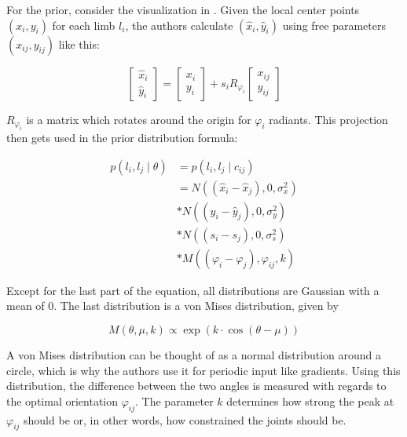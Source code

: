For the prior, consider the visualization in .
Given the local center points $(x_i, y_i)$ for each limb $l_i$, the authors calculate $(\hat{x}_i, \hat{y}_i)$ using free parameters $(x_{ij}, y_{ij})$ like this:

\begin{equation}
    \begin{bmatrix}
        \hat{x}_i \\ 
        \hat{y}_i
    \end{bmatrix}
    =
    \begin{bmatrix}
        x_i \\ 
        y_i
    \end{bmatrix}
    + s_i R_{\varphi_i}
    \begin{bmatrix}
        x_{ij} \\ 
        y_{ij}
    \end{bmatrix}    
\end{equation}

$R_{\varphi_i}$ is a matrix which rotates around the origin for $\varphi_i$ radiants.
This projection then gets used in the prior distribution formula:

\begin{equation}
    \begin{split}
        p(l_i, l_j \mid \theta) 
        &= p(l_i, l_j \mid c_{ij}) \\
        &= N((\hat{x}_i - \hat{x}_j), 0, \sigma_x^2) \\
        &* N((\hat{y}_i - \hat{y}_j), 0, \sigma_y^2) \\
        &* N((s_i - s_j), 0, \sigma_s^2) \\
        &* M((\varphi_i - \varphi_j), \varphi_{ij}, k)
    \end{split}    
\end{equation}

Except for the last part of the equation, all distributions are Gaussian with a mean of $0$.
The last distribution is a von Mises distribution, given by

\begin{equation}
    M(\theta, \mu, k) \propto \exp (k \cdot \cos (\theta - \mu))
\end{equation}

A von Mises distribution can be thought of as a normal distribution around a circle, which is why the authors use it for periodic input like gradients.
Using this distribution, the difference between the two angles is measured with regards to the optimal orientation $\varphi_{ij}$.
The parameter $k$ determines how strong the peak at $\varphi_{ij}$ should be or, in other words, how constrained the joints should be. 

